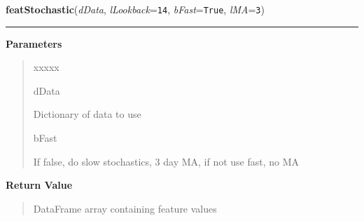 \hspace{.8\funcindent}\begin{boxedminipage}{\funcwidth}

    \raggedright \textbf{featStochastic}(\textit{dData}, \textit{lLookback}={\tt 14}, \textit{bFast}={\tt True}, \textit{lMA}={\tt 3})

    \vspace{-1.5ex}

    \rule{\textwidth}{0.5\fboxrule}
\setlength{\parskip}{2ex}
\setlength{\parskip}{1ex}
      \textbf{Parameters}
      \vspace{-1ex}

      \begin{quote}
        \begin{Ventry}{xxxxx}

          \item[dData]

          Dictionary of data to use

          \item[bFast]

          If false, do slow stochastics, 3 day MA, if not use fast, no MA

        \end{Ventry}

      \end{quote}

      \textbf{Return Value}
    \vspace{-1ex}

      \begin{quote}
      DataFrame array containing feature values

      \end{quote}

    \end{boxedminipage}

    \label{QSTK:qstkfeat:features:featBeta}

    \vspace{0.5ex}

